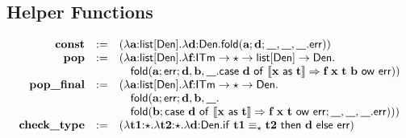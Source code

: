 \documentclass{llncs}
\begin{document}

\subsection{Helper Functions}\label{helper}
\[\begin{array}{rcl}
\tvar{const} & := & (\tlam{a}{\klist{\kDen}}{\tlam{d}{\kDen}{\tfold{\tvar{a}}{\tvar{d}}{\_}{\_}{\_}{\terr}}})\\
\tvar{pop} & := & (\tlam{a}{\klist{\kDen}}{\tlam{f}{\karrow{\kITerm}{\karrow{\kTypeBlur}{\karrow{\klist{\kDen}}{\kDen}}}}{\\& & \quad\tfold{\tvar{a}}{\terr}{d}{b}{\_}{\tdencase{\tvar{d}}{x}{t}{
	\tapp{\tapp{\tapp{\tvar{f}}{\tvar{x}}}{\tvar{t}}}{\tvar{b}}}{\terr}}}})\\
\tvar{pop\_final} & := & (\tlam{a}{\klist{\kDen}}{\tlam{f}{\karrow{\kITerm}{\karrow{\kTypeBlur}{\kDen}}}{\\& & \quad\tfold{\tvar{a}}{\terr}{d}{b}{\_}{\\& & \quad \tfold{\tvar{b}}{\tdencase{\tvar{d}}{x}{t}{\tapp{\tapp{\tvar{f}}{\tvar{x}}}{\tvar{t}}}{\terr}}{\_}{\_}{\_}{\terr}}}})\\
\tvar{check\_type} & := & (\tlam{t1}{\kTypeBlur}{\tlam{t2}{\kTypeBlur}{\tlam{d}{\kDen}{\tifeq{\tvar{t1}}{\tvar{t2}}{\kTypeBlur}{\tvar{d}}{\terr}}}})
\end{array}\]
\end{document}
